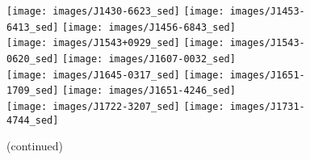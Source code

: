 \documentclass{pasa}%
\begin{document}
\begin{figure*}\ContinuedFloat
\texttt{[image: images/J1430-6623\_sed]}\hspace*{-0.5em}%
\hspace*{-0.5em}\texttt{[image: images/J1453-6413\_sed]}\hspace*{-0.5em}%
\hspace*{-0.5em}\texttt{[image: images/J1456-6843\_sed]} \\[-0.6em]
\texttt{[image: images/J1543+0929\_sed]}\hspace*{-0.5em}%
\hspace*{-0.5em}\texttt{[image: images/J1543-0620\_sed]}\hspace*{-0.5em}%
\hspace*{-0.5em}\texttt{[image: images/J1607-0032\_sed]} \\[-0.6em]
\texttt{[image: images/J1645-0317\_sed]}\hspace*{-0.5em}%
\hspace*{-0.5em}\texttt{[image: images/J1651-1709\_sed]}\hspace*{-0.5em}%
\hspace*{-0.5em}\texttt{[image: images/J1651-4246\_sed]} \\[-0.6em]
\texttt{[image: images/J1722-3207\_sed]}\hspace*{-0.5em}%
\hspace*{-0.5em}\texttt{[image: images/J1731-4744\_sed]}\hspace*{-0.5em}%
\\
\caption{(continued)}
\end{figure*}
\end{document}
